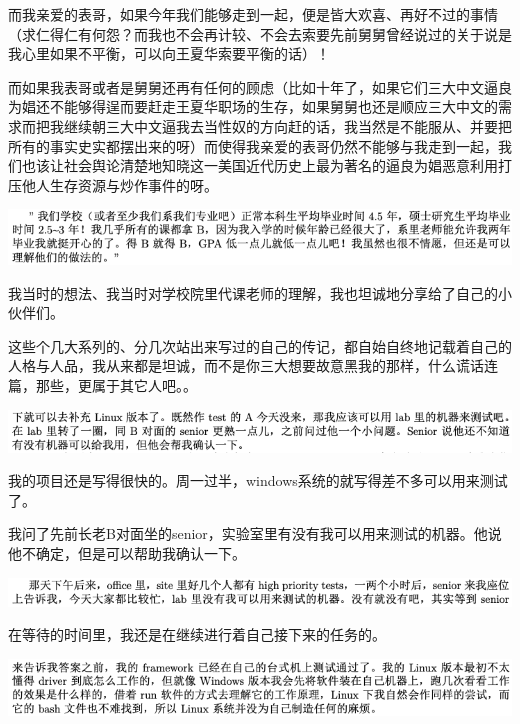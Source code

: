 \documentclass[9pt, b5paper]{article}
\begin{document}
而我亲爱的表哥，如果今年我们能够走到一起，便是皆大欢喜、再好不过的事情（求仁得仁有何怨？而我也不会再计较、不会去索要先前舅舅曾经说过的关于说是我心里如果不平衡，可以向王夏华索要平衡的话）！

而如果我表哥或者是舅舅还再有任何的顾虑（比如十年了，如果它们三大中文逼良为娼还不能够得逞而要赶走王夏华职场的生存，如果舅舅也还是顺应三大中文的需求而把我继续朝三大中文逼我去当性奴的方向赶的话，我当然是不能服从、并要把所有的事实史实都摆出来的呀）而使得我亲爱的表哥仍然不能够与我走到一起，我们也该让社会舆论清楚地知晓这一美国近代历史上最为著名的逼良为娼恶意利用打压他人生存资源与炒作事件的呀。 

\begin{center}
\includegraphics[width=.9\linewidth]{./pic/backups_plans_20210514_124849.png}
\end{center}

我当时的想法、我当时对学校院里代课老师的理解，我也坦诚地分享给了自己的小伙伴们。

这些个几大系列的、分几次站出来写过的自己的传记，都自始自终地记载着自己的人格与人品，我从来都是坦诚，而不是你三大想要故意黑我的那样，什么谎话连篇，那些，更属于其它人吧。。

\begin{center}
\includegraphics[width=.9\linewidth]{./pic/backups_plans_20210514_115800.png}
\end{center}

我的项目还是写得很快的。周一过半，windows系统的就写得差不多可以用来测试了。

我问了先前长老B对面坐的senior，实验室里有没有我可以用来测试的机器。他说他不确定，但是可以帮助我确认一下。 

\begin{center}
\includegraphics[width=.9\linewidth]{./pic/backups_plans_20210514_115922.png}
\end{center}

在等待的时间里，我还是在继续进行着自己接下来的任务的。 

\begin{center}
\includegraphics[width=.9\linewidth]{./pic/backups_plans_20210514_120100.png}
\end{center}
\end{document}
